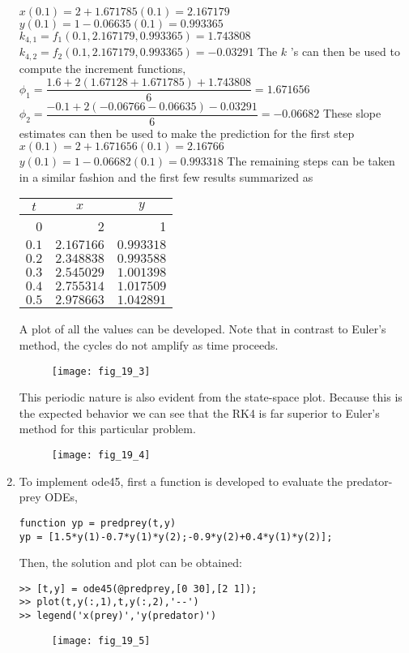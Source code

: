 \documentclass[../main.tex]{subfiles}
\begin{document}
\begin{enumerate}[label=\bfseries(\alph*)]
	\bigbreak
$x(0.1)=2+1.671785(0.1)=2.167179 $
	\bigbreak
$y(0.1)=1-0.06635(0.1)=0.993365 $
	\bigbreak
$k_{4,1}=f_{1}(0.1,2.167179,0.993365)=1.743808 $
	\bigbreak
$k_{4,2}=f_{2}(0.1,2.167179,0.993365)=-0.03291$
	\bigbreak
The $k$ 's can then be used to compute the increment functions,
	\bigbreak
$\phi_{1}=\dfrac{1.6+2(1.67128+1.671785)+1.743808}{6}=1.671656$
	\bigbreak
$\phi_{2}=\dfrac{-0.1+2(-0.06766-0.06635)-0.03291}{6}=-0.06682$
	\bigbreak
These slope estimates can then be used to make the prediction for the first step
	\bigbreak
$x(0.1)=2+1.671656(0.1)=2.16766$
	\bigbreak
$y(0.1)=1-0.06682(0.1)=0.993318$
	\bigbreak
The remaining steps can be taken in a similar fashion and the first few results summarized as
	\bigbreak
\begin{tabular}{rrr}
\hline
\multicolumn{1}{c}{$t$} & \multicolumn{1}{c}{$x$} & \multicolumn{1}{c}{$y$} \\
\hline
0 & 2 & 1 \\
$0.1$ & $2.167166$ & $0.993318$ \\
$0.2$ & $2.348838$ & $0.993588$ \\
$0.3$ & $2.545029$ & $1.001398$ \\
$0.4$ & $2.755314$ & $1.017509$ \\
$0.5$ & $2.978663$ & $1.042891$ \\
\hline
\end{tabular}
	\bigbreak
A plot of all the values can be developed. Note that in contrast to Euler's method, the cycles do not amplify as time proceeds.
	\bigbreak
	\begin{figure}[H]
		\texttt{[image: fig\_19\_3]}
		\label{fig:fig_19_3}
	\end{figure}
	\bigbreak
This periodic nature is also evident from the state-space plot. Because this is the expected behavior we can see that the RK4 is far superior to Euler's method for this particular problem.
	\bigbreak
	\begin{figure}[H]
		\texttt{[image: fig\_19\_4]}
		\label{fig:fig_19_4}
	\end{figure}
	\bigbreak
\item To implement ode45, first a function is developed to evaluate the predator-prey ODEs,
	\bigbreak
\begin{lstlisting}[numbers=none]
function yp = predprey(t,y)
yp = [1.5*y(1)-0.7*y(1)*y(2);-0.9*y(2)+0.4*y(1)*y(2)];
\end{lstlisting}
	\bigbreak
Then, the solution and plot can be obtained:
	\bigbreak
\begin{lstlisting}[numbers=none]
>> [t,y] = ode45(@predprey,[0 30],[2 1]);
>> plot(t,y(:,1),t,y(:,2),'--')
>> legend('x(prey)','y(predator)') 
\end{lstlisting}
	\bigbreak
	\begin{figure}[H]
		\texttt{[image: fig\_19\_5]}
		\label{fig:fig_19_5}
	\end{figure}
	\bigbreak
\end{enumerate}
\end{document}
